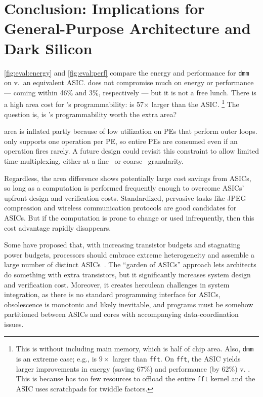\section{Conclusion: Implications for General-Purpose Architecture and Dark Silicon}
\label{sec:implications}

\autoref{fig:eval:energy} and \autoref{fig:eval:perf} compare the energy and performance for {\tt dmm} on \riptide v.\ an equivalent ASIC.
%
\riptide does not compromise much on energy or performance --- coming within 46\% and 3\%, respectively --- but it is not a free lunch.
%
There is a high area cost for \riptide's programmability: \riptide is 57$\times$ larger than the ASIC.%
\footnote{This is without including main memory, which is half of chip area. Also, {\tt dmm} is an extreme case; e.g., \riptide is $9\times$ larger than {\tt fft}. On {\tt fft}, the ASIC yields larger improvements in energy (saving 67\%) and performance (by 62\%) v. \riptide. This is because \riptide has too few resources to offload the entire {\tt fft} kernel and the ASIC uses scratchpads for twiddle factors.}
%
The question is, is \riptide's programmability worth the extra area?

\riptide area is inflated partly because of low utilization on PEs that perform outer loops.
%
\riptide only supports one operation per PE, so entire PEs are consumed even if an operation fires rarely.
%
A future design could revisit this constraint to allow limited time-multiplexing,
either at a fine~\cite{weng2020hybrid} or coarse~\cite{nguyen2021fifer} granularity.

Regardless, the area difference shows potentially large cost savings from ASICs,
so long as a computation is performed frequently enough to overcome
ASICs' upfront design and verification costs.
%
Standardized, pervasive tasks like JPEG compression and wireless communication protocols are good candidates for ASICs.
%
But if the computation is prone to change
or used infrequently, then this cost advantage rapidly disappears.

Some have proposed that, with increasing transistor budgets and
stagnating power budgets, processors should embrace extreme
heterogeneity and assemble a large number of distinct
ASICs~\cite{venkatesh2010conservation,taylor2012dark}.
%
The ``garden of ASICs'' approach lets architects do something
with extra transistors, but it significantly increases
system design and verification cost.
%
Moreover, it creates herculean
challenges in system integration,
%
as there is no standard programming interface for ASICs,
obsolescence is monotonic and likely inevitable,
and programs must be somehow partitioned between ASICs
and cores with accompanying data-coordination issues.

